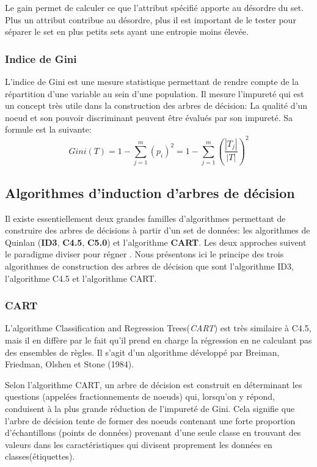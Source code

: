 Le gain permet de calculer ce que l'attribut spécifié apporte au désordre
du set. Plus un attribut contribue au désordre, plus il est important de le
tester pour séparer le set en plus petits sets ayant une entropie moins 
élevée.

\subsubsection{Indice de Gini}
L'indice de Gini est une mesure statistique permettant de rendre compte de la
répartition d'une variable au sein d'une population. Il mesure l'impureté qui
est un concept très utile dans la construction des arbres de décision: La qualité
d'un noeud et son pouvoir discriminant peuvent être évalués par son impureté.
Sa formule est la suivante:
$$
Gini(T) = 1 - \sum_{j=1}^{m}{(p_i)^2} =  1 - \sum_{j=1}^{m}{(\frac{|T_j|}{|T|})^2} 
$$




\subsection{Algorithmes d’induction d’arbres de décision}

Il existe essentiellement deux grandes familles d'algorithmes permettant de construire
des arbres de  décisions à partir d'un set de données: les algorithmes de
Quinlan (\textbf{ID3}, \textbf{C4.5}, \textbf{C5.0}) et l'algorithme
\textbf{CART}. Les deux approches suivent le paradigme \og diviser pour régner
\fg. Nous présentons ici le principe des trois algorithmes de construction des
arbres de décision que sont l'algorithme ID3, l'algorithme C4.5 et l'algorithme
CART.

%

   \subsubsection{CART}
  L'algorithme Classification and Regression Trees(\textit{CART}) est très
  similaire à C4.5, mais il en diffère par le fait qu’il prend en charge la
  régression en ne calculant pas des ensembles de règles. Il s'agit d'un  
  algorithme développé par Breiman, Friedman, Olshen et Stone (1984).

  Selon l'algorithme CART, un arbre de décision est construit en déterminant
  les questions (appelées fractionnements de noeuds) qui, lorsqu'on y répond,
  conduisent à la plus grande réduction de l'impureté de Gini. Cela signifie 
  que l'arbre de décision tente de former des noeuds contenant une forte 
  proportion d'échantillons (points de données) provenant d'une seule classe en
  trouvant des valeurs dans les caractéristiques qui divisent proprement les 
  données en classes(étiquettes).
 
